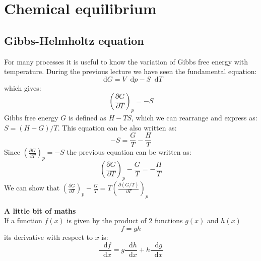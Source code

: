 \documentclass[12pt,a4paper]{report}
\newcommand*\diff{\mathop{}\!\mathrm{d}}
\begin{document}
   \pagestyle{headings}
   \thispagestyle{plain}
   \newpage
   \noindent
   \begin{center}
   \end{center}
   \section*{Chemical equilibrium}
   \subsection*{Gibbs-Helmholtz equation}
   For many processes it is useful to know the variation of Gibbs free energy with temperature. During the previous lecture we have seen the fundamental equation: 
   \begin{equation*}
   \diff G= V \diff p-S \diff T
   \end{equation*}
   which gives:
   \begin{equation*} 
   \left(\frac{\partial G}{\partial T}\right)_{p}=-S
   \end{equation*}
   Gibbs free energy $G$ is defined as $H-TS$, which we can rearrange and express as: $S = (H-G)/T$. This equation can be also written as:
   \begin{equation*}
   -S=\frac{G}{T}-\frac{H}{T}
   \end{equation*}
   Since $\left(\frac{\partial G}{\partial T}\right)_{p}=-S$ the previous equation can be written as:
   \begin{equation*}
   \left(\frac{\partial G}{\partial T}\right)_{p} -\frac{G}{T} =-\frac{H}{T}
   \end{equation*}
   We can show that $ \left(\frac{\partial G}{\partial T}\right)_{p} -\frac{G}{T} = T \left(\frac{\partial (G/T)}{\partial T}\right)_{p} $
   \begin{mdframed}
   \textbf{A little bit of maths}\\
   If a function $ f(x) $ is given by the product of 2 functions $g(x)$ and $h(x)$
   \begin{equation*}
   f=g h
   \end{equation*}
   its derivative with respect to $x$ is: 
   \begin{equation*}
   \frac{\diff f}{\diff x} = g \frac{\diff h}{\diff x}+h \frac{\diff g}{\diff x}
   \end{equation*}
   \end{mdframed}
\end{document}
